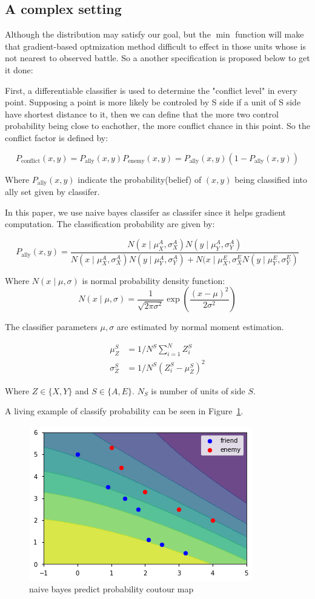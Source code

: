 \documentclass{article}
\begin{document}
\subsection{A complex setting}

Although the distribution may satisfy our goal, 
but the $\min$ function will make that gradient-based optmization method difficult to effect 
in those units whose is not nearest to observed battle. 
So a another specification is proposed below to get it done:

First, a differentiable classifier is used to determine the "conflict level" in every point.
Supposing a point is more likely be controled by S side 
if a unit of S side have shortest distance to it, then we can define that the more two control probability 
being close to eachother, the more conflict chance in this point. So the conflict factor is defined by:

$$
P_{\text{conflict}}(x,y) = P_\text{ally}(x,y) P_\text{enemy}(x,y) = P_\text{ally}(x,y)(1-P_\text{ally}(x,y))
$$

Where $P_\text{ally}(x,y)$ indicate the probability(belief) of $(x,y)$ being classified 
into ally set given by classifer.

In this paper, we use naive bayes classifer as classifer since it helps gradient computation. 
The classification probability are given by:

$$
P_\text{ally}(x,y) = \frac{
N(x\mid \mu^A_X ,\sigma^A_X) N(y \mid \mu^A_Y, \sigma^A_Y)
}{
N(x \mid \mu^A_X , \sigma^A_X) N(y \mid \mu^A_Y , \sigma^A_Y) + 
N(x \mid \mu^E_X , \sigma^E_X N(y \mid \mu^E_Y , \sigma^E_Y)
}
$$

Where $N(x \mid \mu,\sigma)$ is normal probability density function:
$$
N(x \mid \mu,\sigma) = \frac{1}{\sqrt{2\pi \sigma^2}} \exp\left(\frac{(x-\mu)^2}{2\sigma^2}\right)
$$

The classifier parameters $\mu,\sigma$ are estimated by normal moment estimation. 

\begin{align*}
\mu_Z^S    &= 1/N^S \sum_{i=1}^N Z_i^S \\
\sigma_Z^S &= 1/N^S (Z_i^S - \mu_Z^S)^2
\end{align*}

Where $Z \in \{ X,Y \}$ and $S \in \{ A,E \}$. $N_S$ is number of units of side $S$.

A living example of classify probability can be seen in Figure~\ref{fig:naivebayes}.

\begin{figure}[h]
\includegraphics[width=0.6\linewidth]{naivebayes.png}
\caption{naive bayes predict probability coutour map}
\label{fig:naivebayes}
\end{figure}
\end{document}
